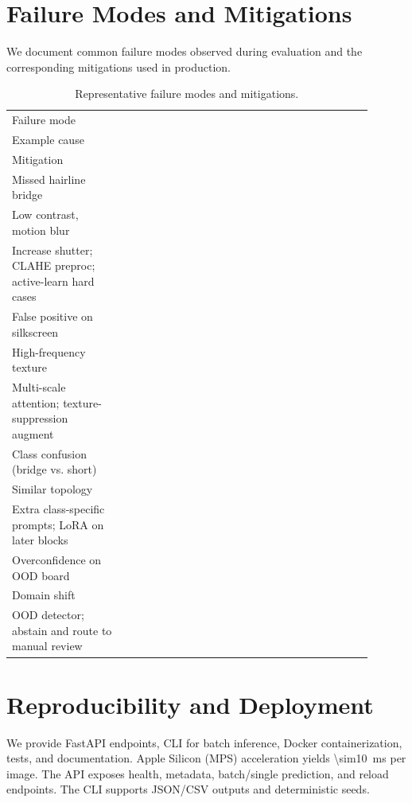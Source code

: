\documentclass[conference]{IEEEtran}
\begin{document}
\section{Failure Modes and Mitigations}
We document common failure modes observed during evaluation and the corresponding mitigations used in production.
\begin{table}[!t]
  \centering
  \caption{Representative failure modes and mitigations.}
  \label{tab:failures}
  \vspace{2pt}
  \begin{tabular}{@{}p{0.28\linewidth}p{0.34\linewidth}p{0.28\linewidth}@{}}
    \toprule
    Failure mode \\ Example cause \\ Mitigation \\
    \midrule
    Missed hairline bridge \\ Low contrast, motion blur \\ Increase shutter; CLAHE preproc; active-learn hard cases \\
    False positive on silkscreen \\ High-frequency texture \\ Multi-scale attention; texture-suppression augment \\
    Class confusion (bridge vs. short) \\ Similar topology \\ Extra class-specific prompts; LoRA on later blocks \\
    Overconfidence on OOD board \\ Domain shift \\ OOD detector; abstain and route to manual review \\
    \bottomrule
  \end{tabular}
\end{table}

\section{Reproducibility and Deployment}
We provide FastAPI endpoints, CLI for batch inference, Docker containerization, tests, and documentation. Apple Silicon (MPS) acceleration yields \SI{\sim10}{ms} per image. The API exposes health, metadata, batch/single prediction, and reload endpoints. The CLI supports JSON/CSV outputs and deterministic seeds.
\end{document}
